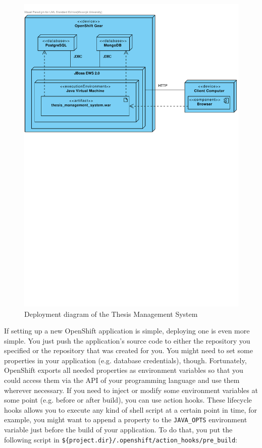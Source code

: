 \begin{figure}[h]
    \centering
        \includegraphics[trim=0 480 0 30, clip, keepaspectratio, width=\textwidth]{./images/deployment-diagram.pdf}
    \caption{Deployment diagram of the Thesis Management System}
    \label{fig:deployment-diagram}
\end{figure}

If setting up a new OpenShift application is simple, deploying one is even more simple. You just push the application's source code to either the repository you specified or the repository that was created for you. You might need to set some properties in your application (e.g. database credentials), though. Fortunately, OpenShift exports all needed properties as environment variables so that you could access them via the API of your programming language and use them wherever necessary. If you need to inject or modify some environment variables at some point (e.g. before or after build), you can use action hooks. These lifecycle hooks allows you to execute any kind of shell script at a certain point in time, for example, you might want to append a property to the \texttt{JAVA\_OPTS} environment variable just before the build of your application. To do that, you put the following script in \texttt{\$\{project.dir\}/.openshift/action\_hooks/pre\_build}:

